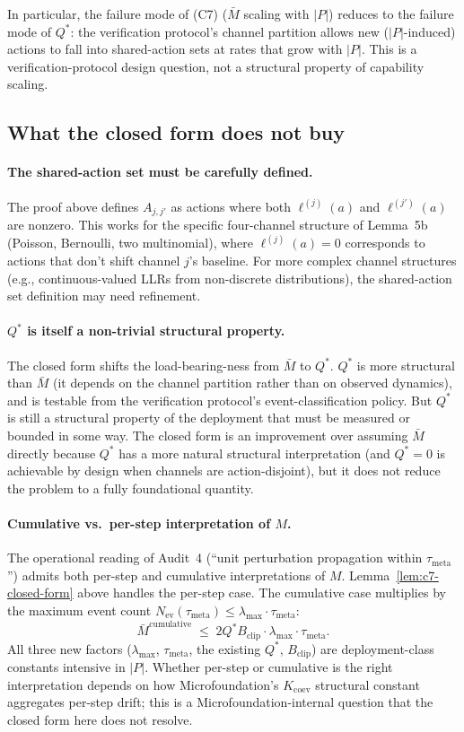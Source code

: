 \documentclass{article}
\newcommand{\Bclip}{B_{\mathrm{clip}}}
\newcommand{\Nev}{N_{\mathrm{ev}}}
\begin{document}
In particular, the failure mode of (C7) ($\bar{M}$ scaling with
$|P|$) reduces to the failure mode of $Q^*$: the verification
protocol's channel partition allows new ($|P|$-induced) actions to
fall into shared-action sets at rates that grow with $|P|$.  This
is a verification-protocol design question, not a structural
property of capability scaling.

\subsection{What the closed form does not buy}

\paragraph{The shared-action set must be carefully defined.}  The
proof above defines $A_{j, j'}$ as actions where both
$\ell^{(j)}(a)$ and $\ell^{(j')}(a)$ are nonzero.  This works for
the specific four-channel structure of Lemma~5b (Poisson, Bernoulli,
two multinomial), where $\ell^{(j)}(a) = 0$ corresponds to actions
that don't shift channel $j$'s baseline.  For more complex channel
structures (e.g., continuous-valued LLRs from non-discrete
distributions), the shared-action set definition may need
refinement.

\paragraph{$Q^*$ is itself a non-trivial structural property.}
The closed form shifts the load-bearing-ness from $\bar{M}$ to
$Q^*$.  $Q^*$ is more structural than $\bar{M}$ (it depends on the
channel partition rather than on observed dynamics), and is
testable from the verification protocol's event-classification
policy.  But $Q^*$ is still a structural property of the
deployment that must be measured or bounded in some way.  The
closed form is an improvement over assuming $\bar{M}$ directly
because $Q^*$ has a more natural structural interpretation (and
$Q^* = 0$ is achievable by design when channels are
action-disjoint), but it does not reduce the problem to a fully
foundational quantity.

\paragraph{Cumulative vs.\ per-step interpretation of $M$.}  The
operational reading of Audit~4 (``unit perturbation propagation
within $\tau_{\mathrm{meta}}$'') admits both per-step and
cumulative interpretations of $M$.  Lemma~\ref{lem:c7-closed-form}
above handles the per-step case.  The cumulative case multiplies
by the maximum event count $\Nev(\tau_{\mathrm{meta}}) \leq
\lambda_{\max} \cdot \tau_{\mathrm{meta}}$:
\[
  \bar{M}^{\mathrm{cumulative}} \;\leq\; 2 Q^* \Bclip \cdot
  \lambda_{\max} \cdot \tau_{\mathrm{meta}}.
\]
All three new factors ($\lambda_{\max}$, $\tau_{\mathrm{meta}}$,
the existing $Q^*$, $\Bclip$) are deployment-class constants
intensive in $|P|$.  Whether per-step or cumulative is the right
interpretation depends on how Microfoundation's
$K_{\mathrm{coev}}$ structural constant aggregates per-step
drift; this is a Microfoundation-internal question that the
closed form here does not resolve.
\end{document}

